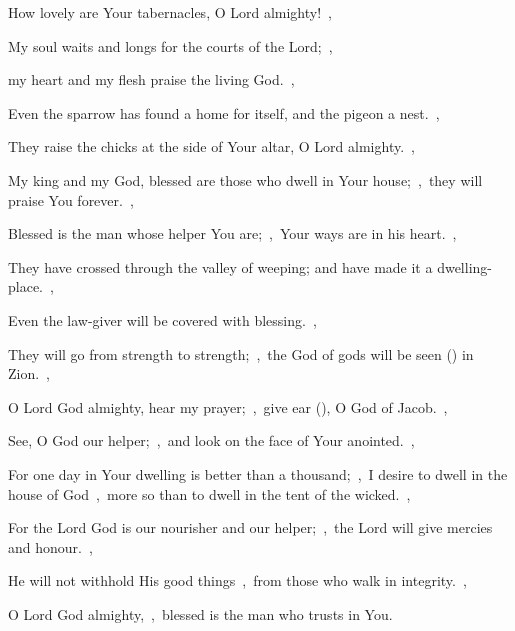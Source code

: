 \documentclass[12pt,twoside,a5paper]{article}
\begin{document}

\begin{normalparskip}
  How lovely are Your tabernacles, O Lord almighty!~\sep

  My soul waits and longs for the courts of the Lord;~\sep


  my heart and my flesh praise the living God.~\sep

  Even the sparrow has found a home for itself, and the pigeon a nest.~\sep

  They raise the chicks at the side of Your altar, O Lord almighty.~\sep

  My king and my God, blessed are those who dwell in Your house;~\sep\ they will praise You forever.~\sep

  Blessed is the man whose helper You are;~\sep\ Your ways are in his heart.~\sep

  They have crossed through the valley of weeping; and have made it a dwelling-place.~\sep

  Even the law-giver will be covered with blessing.~\sep

  They will go from strength to strength;~\sep\ the God of gods will be seen () in Zion.~\sep

  O Lord God almighty, hear my prayer;~\sep\ give ear (), O God of Jacob.~\sep

  See, O God our helper;~\sep\ and look on the face of Your anointed.~\sep

  For one day in Your dwelling is better than a thousand;~\sep\ I desire to dwell in the house of God~\sep\ more so than to dwell in the tent of the wicked.~\sep

  For the Lord God is our nourisher and our helper;~\sep\ the Lord will give mercies and honour.~\sep

  He will not withhold His good things~\sep\ from those who walk in integrity.~\sep

  O Lord God almighty,~\sep\ blessed is the man who trusts in You.
\end{normalparskip}

\end{document}
